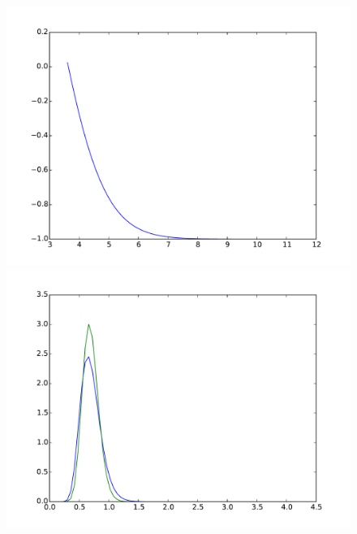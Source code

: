 \documentclass{article}
\begin{document}
\begin{figure}[htb]
\begin{minipage}{.3\textwidth}
	\end{minipage}
	\begin{minipage}{.3\textwidth}
		\centering
		\includegraphics[width=0.97\linewidth]{bootstrap-filter/relative_tail_complex_4_3.pdf}
	\end{minipage}
	\begin{minipage}{.3\textwidth}
		\centering
		\includegraphics[width=0.97\linewidth]{bootstrap-filter/global_complex_3_1.pdf}
	\end{minipage}
	\begin{minipage}{.3\textwidth}
		\centering

\end{minipage}
\end{figure}
\end{document}

